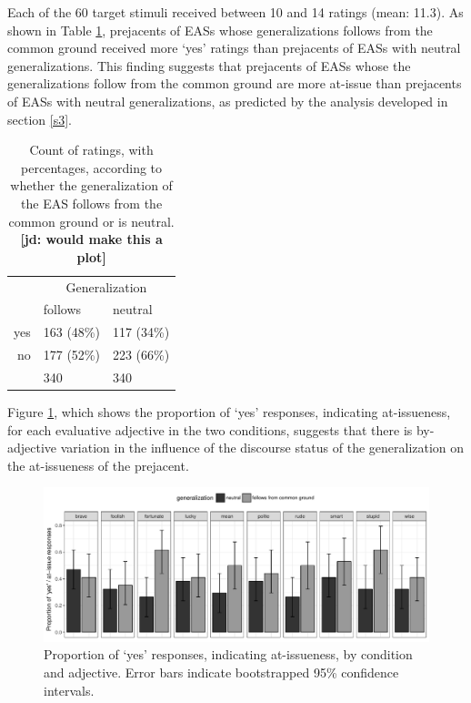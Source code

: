 \documentclass[11pt,fleqn]{article}
\newcommand{\6}{\mbox{$[\hspace*{-.6mm}[$}}
\newcommand{\9}{\mbox{$]\hspace*{-.6mm}]$}}
\newcommand{\jd}[1]{\textbf{\color{green}[jd: #1]}}
\begin{document}
Each of the 60 target stimuli received between 10 and 14 ratings (mean: 11.3). As shown in Table \ref{t-ai}, prejacents of EASs whose generalizations follows from the common ground  received more `yes' ratings than prejacents of EASs with neutral generalizations. This finding suggests that prejacents of EASs whose the generalizations follow from the common ground are more at-issue than prejacents of EASs with neutral generalizations, as predicted by the analysis developed in section \ref{s3}.

\begin{table}[h!]
\centering

\begin{tabular}{r|ll}

 & \multicolumn{2}{c}{Generalization} \\

 &  follows & neutral   \\ 
 
 \toprule

yes & 163 (48\%) & 117 (34\%) \\ 

no & 177 (52\%) & 223 (66\%) \\ 

\hline

& 340 & 340 \\ 

\end{tabular}

\caption{Count of ratings, with percentages, according to whether the generalization of the EAS follows from the common ground or is neutral.\jd{would make this a plot}}\label{t-ai}

\end{table}

Figure \ref{f-ai-by-adj}, which shows the proportion of `yes' responses, indicating at-issueness, for each evaluative adjective in the two conditions, suggests that there is by-adjective variation in the influence of the discourse status of the generalization on the at-issueness of the prejacent.

\begin{figure}[H]
\begin{center}
\includegraphics[scale=.6]{../exp2/graphs/proportion-ai-by-condition-and-adj}

\caption{Proportion of `yes' responses, indicating at-issueness, by condition and adjective. Error bars indicate bootstrapped 95\% confidence intervals.}\label{f-ai-by-adj}
\end{center}
\end{figure}
\end{document}
